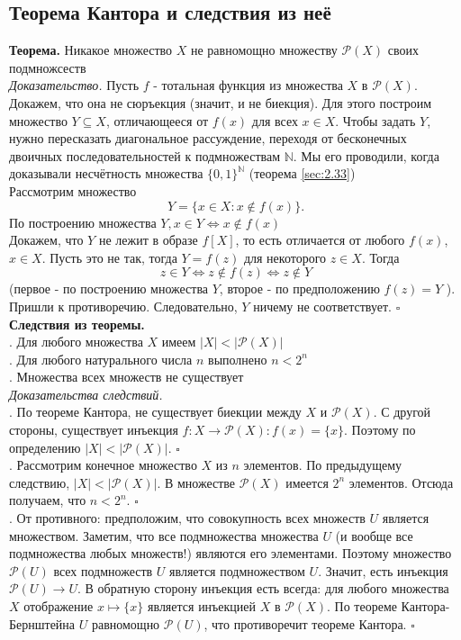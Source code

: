 \documentclass[a4paper]{article}
\newcommand{\qed}{\hfill$\square$}
\begin{document}
\subsection{Теорема Кантора и следствия из неё}
\textbf{Теорема.} Никакое множество $X$ не равномощно множеству $\mathcal{P}(X)$ своих подмножсеств\\[2mm]
\textit{Доказательство.} Пусть $f$ - тотальная функция из множества $X$ в $\mathcal{P}(X)$. Докажем, что она не сюръекция (значит, и не биекция). Для этого построим множество $Y \subseteq X$, отличающееся от $f(x)$ для всех $x \in X$. Чтобы задать $Y$, нужно пересказать диагональное рассуждение, переходя от бесконечных двоичных последовательностей к подмножествам $\mathbb{N}$. Мы его проводили, когда доказывали несчётность множества $\{0,1\}^{\mathbb{N}}$ (теорема \ref{sec:2.33})\\[2mm]
Рассмотрим множество
$$
Y=\{x \in X: x \notin f(x)\} .
$$
По построению множества $Y, x \in Y \Leftrightarrow x \notin f(x)$\\[2mm]
\indent Докажем, что $Y$ не лежит в образе $f[X]$, то есть отличается от любого $f(x)$, $x \in X$. Пусть это не так, тогда $Y=f(z)$ для некоторого $z \in X$. Тогда
$$
z \in Y \Leftrightarrow z \notin f(z) \Leftrightarrow z \notin Y
$$
(первое - по построению множества $Y$, второе - по предположению $f(z)=Y$ ). Пришли к противоречию. Следовательно, $Y$ ничему не соответствует. \qed\\[2mm]
\textbf{Следствия из теоремы.}\\[2mm]
. Для любого множества $X$ имеем $|X|<|\mathcal{P}(X)|$\\[2mm]
. Для любого натурального числа $n$ выполнено $n<2^{n}$\\[2mm]
. Множества всех множеств не существует\\[2mm]
\textit{Доказательства следствий.}\\[2mm]
. По теореме Кантора, не существует биекции между $X$ и $\mathcal{P}(X)$. С другой стороны, существует инъекция $f: X \rightarrow \mathcal{P}(X): f(x)=\{x\}$. Поэтому по определению $|X|<|\mathcal{P}(X)|$. \qed\\[2mm]
. Рассмотрим конечное множество $X$ из $n$ элементов. По предыдущему следствию, $|X|<|\mathcal{P}(X)|$. В множестве $\mathcal{P}(X)$ имеется $2^{n}$ элементов. Отсюда получаем, что $n<2^{n}$. \qed\\[2mm]
. От противного: предположим, что совокупность всех множеств $U$ является множеством. Заметим, что все подмножества множества $U$ (и вообще все подмножества любых множеств!) являются его элементами. Поэтому множество $\mathcal{P}(U)$ всех подмножеств $U$ является подмножеством $U$. Значит, есть инъекция $\mathcal{P}(U) \rightarrow U$. В обратную сторону инъекция есть всегда: для любого множества $X$ отображение $x \mapsto\{x\}$ является инъекцией $X$ в $\mathcal{P}(X)$. По теореме Кантора-Бернштейна $U$ равномощно $\mathcal{P}(U)$, что противоречит теореме Кантора. \qed
\end{document}

